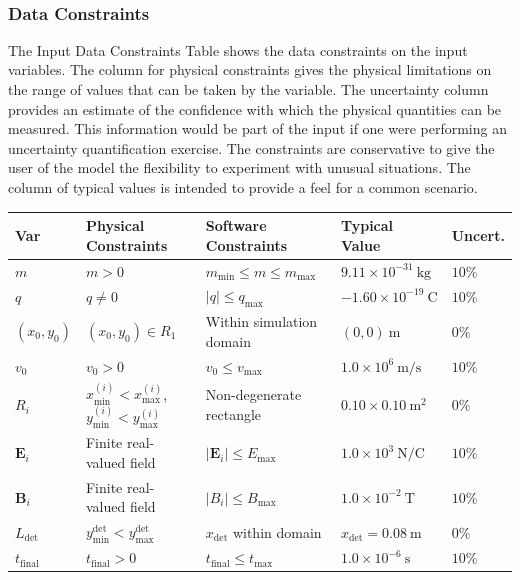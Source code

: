 \documentclass[12pt]{article}
\begin{document}
~\newline





\subsubsection{Data Constraints} \label{sec_DataConstraints}

The Input Data Constraints Table shows the data constraints on the input
variables. The column for physical constraints gives the physical limitations on
the range of values that can be taken by the variable. The uncertainty column
provides an estimate of the confidence with which the physical quantities can be
measured. This information would be part of the input if one were performing an
uncertainty quantification exercise. The constraints are conservative to give
the user of the model the flexibility to experiment with unusual situations. The
column of typical values is intended to provide a feel for a common scenario.

\begin{table}[!h]
\caption{Input Data Constraints} \label{TblInputVar}
\renewcommand{\arraystretch}{1.2}
\noindent \begin{longtable*}{l l l l l}
  \toprule
  \textbf{Var} & \textbf{Physical Constraints} & \textbf{Software Constraints} & \textbf{Typical Value} & \textbf{Uncert.} \\
  \midrule
  $m$ &
  $m > 0$ &
  $m_{\min} \le m \le m_{\max}$ &
  $9.11\times 10^{-31}\ \si{\kilogram}$ &
  $10\%$
  \\
  $q$ &
  $q \neq 0$ &
  $|q| \le q_{\max}$ &
  $-1.60\times 10^{-19}\ \si{\coulomb}$ &
  $10\%$
  \\
  $(x_0,y_0)$ &
  $(x_0,y_0)\in R_1$ &
  Within simulation domain &
  $(0,0)\ \si{\metre}$ &
  $0\%$
  \\
  $v_0$ &
  $v_0 > 0$ &
  $v_0 \le v_{\max}$ &
  $1.0\times 10^{6}\ \si{\metre\per\second}$ &
  $10\%$
  \\
  $R_i$ &
  $x^{(i)}_{\min} < x^{(i)}_{\max}$,\ $y^{(i)}_{\min} < y^{(i)}_{\max}$ &
  Non-degenerate rectangle &
  $0.10\times 0.10\ \si{\metre^2}$ &
  $0\%$
  \\
  $\mathbf{E}_i$ &
  Finite real-valued field &
  $|\mathbf{E}_i| \le E_{\max}$ &
  $1.0\times 10^{3}\ \si{\newton\per\coulomb}$ &
  $10\%$
  \\
  $\mathbf{B}_i$ &
  Finite real-valued field &
  $|B_i| \le B_{\max}$ &
  $1.0\times 10^{-2}\ \si{\tesla}$ &
  $10\%$
  \\
  $L_{\mathrm{det}}$ &
  $y^{\mathrm{det}}_{\min} < y^{\mathrm{det}}_{\max}$ &
  $x_{\mathrm{det}}$ within domain &
  $x_{\mathrm{det}} = 0.08\ \si{\metre}$ &
  $0\%$
  \\
  $t_{\text{final}}$ &
  $t_{\text{final}} > 0$ &
  $t_{\text{final}} \le t_{\max}$ &
  $1.0\times 10^{-6}\ \si{\second}$ &
  $10\%$
  \\
  \bottomrule
\end{longtable*}
\end{table}
\end{document}

